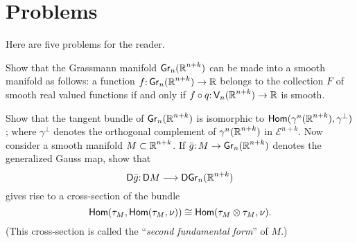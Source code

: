 \section*{Problems}
Here are five problems for the reader.
\begin{problem}\label{prob-5-A}
	Show that the Grassmann manifold $\grass{n}{n+k}$ can be
	made into a smooth manifold as follows: a function $\map{f}{\grass{n}{n+k}}{\R}$
	belongs to the collection $F$ of smooth real valued functions if and only if
	$\map{f\circ q}{\stiefel{n}{}{n+k}}{\R}$ is smooth.
\end{problem}
\begin{problem}\label{prob-5-B}
	Show that the tangent bundle of $\grass{n}{n+k}$ is 
	isomorphic to $\mathsf{Hom}(\gamma^n(\boldsymbol{\mathbb{R}}^{n+k} ),\gamma^\perp)$; where $ \gamma^\perp $ denotes the orthogonal 
	complement of $\gamma^n(\boldsymbol{\mathbb{R}}^{n+k} )$ in $\mathcal{E}^{n+k}$. Now consider a smooth manifold $M\subset \boldsymbol{\mathbb{R}}^{n+k}$.
	If $\map{\bar{g}}{M}{\grass{n}{n+k}}$ denotes the generalized Gauss map, show that
	\[\map{\mathsf{D}\bar{g}}{\mathsf{D} M}{\mathsf{D}\grass{n}{n+k}}\]
	gives rise to a cross-section of the bundle
	\[\mathsf{Hom}(\tau_M,\mathsf{Hom}(\tau_M,\nu))\cong \mathsf{Hom}(\tau_M\otimes\tau_M,\nu).\]
	(This cross-section is called the ``\textit{second fundamental form}'' of $M$.)
\end{problem}

